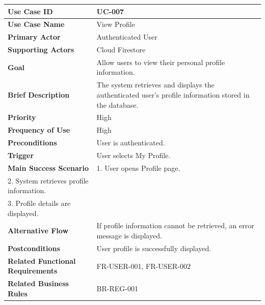 \begin{longtable}{|p{4cm}|p{10cm}|}

\hline
\textbf{Use Case ID} &
UC-007 \\
\hline

\textbf{Use Case Name} &
View Profile \\
\hline

\textbf{Primary Actor} &
Authenticated User \\
\hline

\textbf{Supporting Actors} &
Cloud Firestore \\
\hline

\textbf{Goal} &
Allow users to view their personal profile information. \\
\hline

\textbf{Brief Description} &
The system retrieves and displays the authenticated user's profile
information stored in the database. \\
\hline

\textbf{Priority} &
High \\
\hline

\textbf{Frequency of Use} &
High \\
\hline

\textbf{Preconditions} &
User is authenticated. \\
\hline

\textbf{Trigger} &
User selects My Profile. \\
\hline

\textbf{Main Success Scenario} &
1. User opens Profile page.\\
2. System retrieves profile information.\\
3. Profile details are displayed.\\
\hline

\textbf{Alternative Flow} &
If profile information cannot be retrieved, an error message is displayed.\\
\hline

\textbf{Postconditions} &
User profile is successfully displayed.\\
\hline

\textbf{Related Functional Requirements} &
FR-USER-001, FR-USER-002 \\
\hline

\textbf{Related Business Rules} &
BR-REG-001 \\
\hline

\end{longtable}


